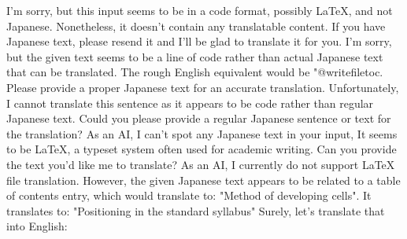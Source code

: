 I'm sorry, but this input seems to be in a code format, possibly LaTeX, and not Japanese. Nonetheless, it doesn't contain any translatable content. If you have Japanese text, please resend it and I'll be glad to translate it for you.
I'm sorry, but the given text seems to be a line of code rather than actual Japanese text that can be translated. The rough English equivalent would be "@writefile{toc}{\protected@file@percent }. Please provide a proper Japanese text for an accurate translation.
Unfortunately, I cannot translate this sentence as it appears to be code rather than regular Japanese text. Could you please provide a regular Japanese sentence or text for the translation?
As an AI, I can't spot any Japanese text in your input, It seems to be LaTeX, a typeset system often used for academic writing. Can you provide the text you'd like me to translate?
As an AI, I currently do not support LaTeX file translation. However, the given Japanese text appears to be related to a table of contents entry, which would translate to: "Method of developing cells".
It translates to: "Positioning in the standard syllabus"
Surely, let's translate that into English:


